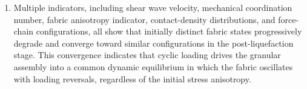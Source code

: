 \begin{enumerate}
\item Multiple indicators, including shear wave velocity, mechanical coordination number, fabric anisotropy indicator, contact-density distributions, and force-chain configurations, all show that initially distinct fabric states progressively degrade and converge toward similar configurations in the post-liquefaction stage. This convergence indicates that cyclic loading drives the granular assembly into a common dynamic equilibrium in which the fabric oscillates with loading reversals, regardless of the initial stress anisotropy.

\end{enumerate}
